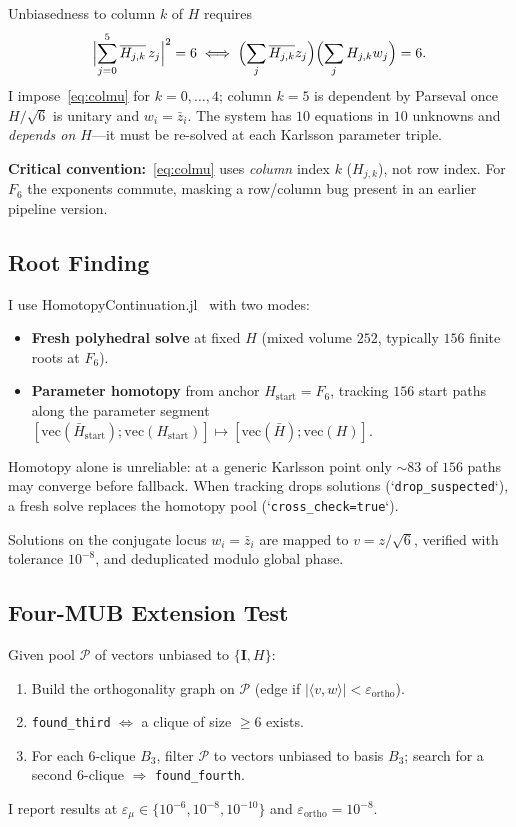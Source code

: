 \documentclass[onecolumn]{IEEEtran}
\begin{document}
Unbiasedness to column $k$ of $H$ requires
\begin{equation}
    \label{eq:colmu}
    \Bigl|\sum_{j=0}^{5}\overline{H_{j,k}}\,z_j\Bigr|^2=6
    \;\Longleftrightarrow\;
    \Bigl(\sum_{j}\overline{H_{j,k}}z_j\Bigr)\Bigl(\sum_{j}H_{j,k}w_j\Bigr)=6.
\end{equation}
I impose~\eqref{eq:colmu} for $k=0,\ldots,4$; column $k=5$ is dependent by Parseval once $H/\sqrt{6}$ is unitary and $w_i=\bar z_i$.
The system has $10$ equations in $10$ unknowns and \emph{depends on $H$}---it must be re-solved at each Karlsson parameter triple.

\textbf{Critical convention:}~\eqref{eq:colmu} uses \emph{column} index $k$ ($H_{j,k}$), not row index.
For $F_6$ the exponents commute, masking a row/column bug present in an earlier pipeline version.

\subsection{Root Finding}
I use HomotopyContinuation.jl~\cite{HomotopyContinuation} with two modes:
\begin{itemize}
    \item \textbf{Fresh polyhedral solve} at fixed $H$ (mixed volume $252$, typically $156$ finite roots at $F_6$).
    \item \textbf{Parameter homotopy} from anchor $H_{\mathrm{start}}=F_6$, tracking $156$ start paths along the parameter segment $[\mathrm{vec}(\bar H_{\mathrm{start}});\mathrm{vec}(H_{\mathrm{start}})]\mapsto[\mathrm{vec}(\bar H);\mathrm{vec}(H)]$.
\end{itemize}
Homotopy alone is unreliable: at a generic Karlsson point only $\sim$83 of $156$ paths may converge before fallback.
When tracking drops solutions (`\texttt{drop\_suspected}`), a fresh solve replaces the homotopy pool (`\texttt{cross\_check=true}`).

Solutions on the conjugate locus $w_i=\bar z_i$ are mapped to $v=z/\sqrt{6}$, verified with tolerance $10^{-8}$, and deduplicated modulo global phase.

\subsection{Four-MUB Extension Test}
Given pool $\mathcal{P}$ of vectors unbiased to $\{\mathbf{I},H\}$:
\begin{enumerate}
    \item Build the orthogonality graph on $\mathcal{P}$ (edge if $|\langle v,w\rangle|<\varepsilon_{\mathrm{ortho}}$).
    \item \texttt{found\_third} $\Leftrightarrow$ a clique of size $\ge6$ exists.
    \item For each $6$-clique $B_3$, filter $\mathcal{P}$ to vectors unbiased to basis $B_3$; search for a second $6$-clique $\Rightarrow$ \texttt{found\_fourth}.
\end{enumerate}
I report results at $\varepsilon_{\mu}\in\{10^{-6},10^{-8},10^{-10}\}$ and $\varepsilon_{\mathrm{ortho}}=10^{-8}$.
\end{document}
